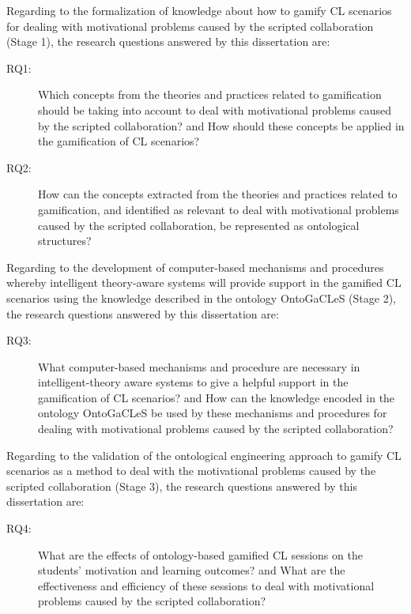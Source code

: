 Regarding to the formalization of knowledge about how to gamify CL scenarios for dealing with motivational problems caused by the scripted collaboration (Stage 1), the research questions answered by this dissertation are:

\begin{description}
\item[RQ1:]
Which concepts from the theories and practices related to gamification should be taking into account to deal with motivational problems caused by the scripted collaboration? and How should these concepts be applied in the gamification of CL scenarios?

\item[RQ2:]
How can the concepts extracted from the theories and practices related to gamification, and identified as relevant to deal with motivational problems caused by the scripted collaboration, be represented as ontological structures?
\end{description}

Regarding to the development of computer-based mechanisms and procedures whereby intelligent theory-aware systems will provide support in the gamified CL scenarios using the knowledge described in the ontology OntoGaCLeS (Stage 2), the research questions answered by this dissertation are:

\begin{description}
\item[RQ3:]
What computer-based mechanisms and procedure are necessary in intelligent-theory aware systems to give a helpful support in the gamification of CL scenarios? and How can the knowledge encoded in the ontology OntoGaCLeS be used by these mechanisms and procedures for dealing with motivational problems caused by the scripted collaboration?
\end{description}

Regarding to the validation of the ontological engineering approach to gamify CL scenarios as a method to deal with the motivational problems caused by the scripted collaboration (Stage 3), the research questions answered by this dissertation are:

\begin{description}
\item[RQ4:]
What are the effects of ontology-based gamified CL sessions on the students’ motivation and learning outcomes? and What are the effectiveness and efficiency of these sessions to deal with motivational problems caused by the scripted collaboration?
\end{description}

